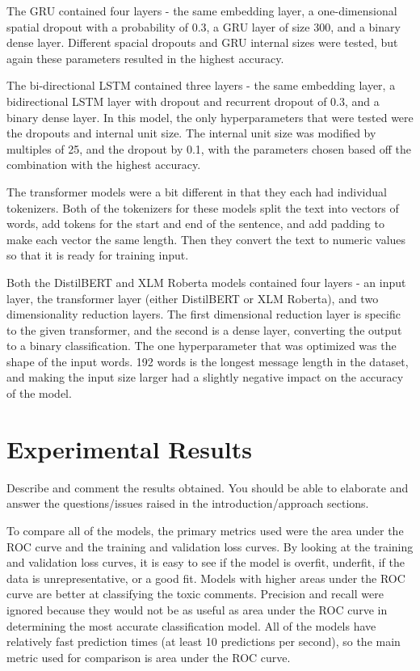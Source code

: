 \documentclass{article}
\begin{document}
The GRU contained four layers - the same embedding layer, a one-dimensional spatial dropout with a probability of 0.3, a GRU layer of size 300, and a binary dense layer. Different spacial dropouts and GRU internal sizes were tested, but again these parameters resulted in the highest accuracy.

The bi-directional LSTM contained three layers - the same embedding layer, a bidirectional LSTM layer with dropout and recurrent dropout of 0.3, and a binary dense layer. In this model, the only hyperparameters that were tested were the dropouts and internal unit size. The internal unit size was modified by multiples of 25, and the dropout by 0.1, with the parameters chosen based off the combination with the highest accuracy.

The transformer models were a bit different in that they each had individual tokenizers. Both of the tokenizers for these models split the text into vectors of words, add tokens for the start and end of the sentence, and add padding to make each vector the same length. Then they convert the text to numeric values so that it is ready for training input.

Both the DistilBERT and XLM Roberta models contained four layers - an input layer, the transformer layer (either DistilBERT or XLM Roberta), and two dimensionality reduction layers. The first dimensional reduction layer is specific to the given transformer, and the second is a dense layer, converting the output to a binary classification. The one hyperparameter that was optimized was the shape of the input words. 192 words is the longest message length in the dataset, and making the input size larger had a slightly negative impact on the accuracy of the model.

\section{Experimental Results}

Describe and comment the results
obtained. You should be able to elaborate and answer the
questions/issues raised in the introduction/approach sections.

To compare all of the models, the primary metrics used were the area under the ROC curve and the training and validation loss curves. By looking at the training and validation loss curves, it is easy to see if the model is overfit, underfit, if the data is unrepresentative, or a good fit. Models with higher areas under the ROC curve are better at classifying the toxic comments. Precision and recall were ignored because they would not be as useful as area under the ROC curve in determining the most accurate classification model. All of the models have relatively fast prediction times (at least 10 predictions per second), so the main metric used for comparison is area under the ROC curve.
\end{document}
